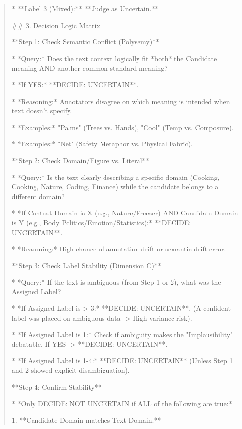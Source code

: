 \begin{quote}
*   **Label 3 (Mixed):** **Judge as Uncertain.**



## 3. Decision Logic Matrix



**Step 1: Check Semantic Conflict (Polysemy)**

*   *Query:* Does the text context logically fit *both* the Candidate meaning AND another common standard meaning?

*   *If YES:* **DECIDE: UNCERTAIN**.

    *   *Reasoning:* Annotators disagree on which meaning is intended when text doesn't specify.

    *   *Examples:* "Palms" (Trees vs. Hands), "Cool" (Temp vs. Composure).

    *   *Examples:* "Net" (Safety Metaphor vs. Physical Fabric).



**Step 2: Check Domain/Figure vs. Literal**

*   *Query:* Is the text clearly describing a specific domain (Cooking, Cooking, Nature, Coding, Finance) while the candidate belongs to a different domain?

*   *If Context Domain is X (e.g., Nature/Freezer) AND Candidate Domain is Y (e.g., Body Politics/Emotion/Statistics):* **DECIDE: UNCERTAIN**.

    *   *Reasoning:* High chance of annotation drift or semantic drift error.



**Step 3: Check Label Stability (Dimension C)**

*   *Query:* If the text is ambiguous (from Step 1 or 2), what was the Assigned Label?

*   *If Assigned Label is > 3:* **DECIDE: UNCERTAIN**. (A confident label was placed on ambiguous data -> High variance risk).

*   *If Assigned Label is 1:* Check if ambiguity makes the "Implausibility" debatable. If YES -> **DECIDE: UNCERTAIN**.

*   *If Assigned Label is 1-4:* **DECIDE: UNCERTAIN** (Unless Step 1 and 2 showed explicit disambiguation).



**Step 4: Confirm Stability**

*   *Only DECIDE: NOT UNCERTAIN if ALL of the following are true:*

    1.  **Candidate Domain matches Text Domain.**


\end{quote}
